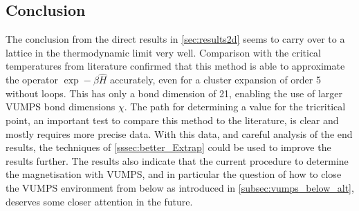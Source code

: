 \subsection{Conclusion}

The conclusion from the direct results in \cref{sec:results2d} seems to carry over to a lattice in the thermodynamic limit very well. Comparison with the critical temperatures from literature confirmed that this method is able to approximate the operator $\exp -\beta \hat{H}$ accurately, even for a cluster expansion of order 5 without loops. This has only a bond dimension of 21, enabling the use of larger \Gls{VUMPS} bond dimensions $\chi$.
The path for determining a value for the tricritical point, an important test  to compare this method to the literature, is clear and mostly requires more precise data. With this data, and careful analysis of the end results, the techniques of \cref{sssec:better_Extrap} could be used to improve  the results further. The results also indicate that the current procedure to determine the magnetisation with \Gls{VUMPS}, and in particular the question of how to close the \Gls{VUMPS} environment from below as introduced in \cref{subsec:vumps_below_alt}, deserves some closer attention in the future.
